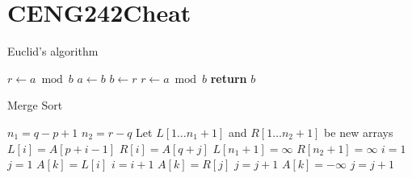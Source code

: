 \chapter{CENG242Cheat}

\begin{algorithm}
\caption{Euclid’s algorithm}\label{euclid}
\begin{algorithmic}[1]
\State $r\gets a\bmod b$
\State $a\gets b$
\State $b\gets r$
\State $r\gets a\bmod b$
\EndWhile\label{euclidendwhile}
\State \textbf{return} $b$
\EndProcedure
\end{algorithmic}
\end{algorithm}



 \begin{algorithm}
	\caption{Merge Sort}
	\begin{algorithmic}[1]
		
		\State ${n_1} = q - p + 1$
		\State ${n_2} = r - q$
		\State Let $L[1 \ldots {n_1} + 1]$ and $R[1 \ldots {n_2} + 1]$ be new arrays
		\State $L[i] = A[p + i - 1]$
		\EndFor
		\State $R[i] = A[q + j]$
		\EndFor
		\State $L[{n_1} + 1] =  \infty $
		\State $R[{n_2} + 1] =  \infty $
		\State $i = 1$
		\State $j = 1$
		\State $A[k] = L[i]$
		\State $i = i + 1$
		\State $A[k] = R[j]$
		\State $j = j + 1$
		\Else
		\State $A[k] = - \infty$ 
		\State $j = j + 1$
		\EndIf
		\EndFor
		\EndFunction
		
	\end{algorithmic}
\end{algorithm}

